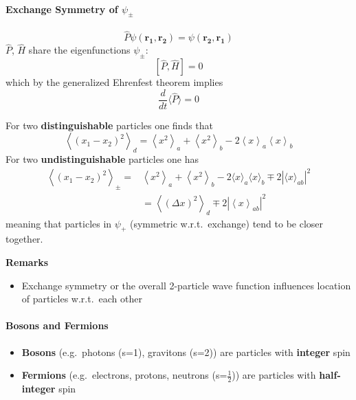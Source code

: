 \paragraph[Exchange Symmetry]{Exchange Symmetry of $\psi_\pm$}

\newpar{}

\begin{equation*}
    \widehat{P}\psi(\mathbf{r_1},\mathbf{r_2})=\psi(\mathbf{r_2},\mathbf{r_1})
\end{equation*}
$\widehat{P}$, $\widehat{H}$ share the eigenfunctions $\psi_{\pm}$:
\begin{equation*}
    \left[\widehat{P},\widehat{H}\right]=0
\end{equation*}
which by the generalized Ehrenfest theorem implies
\begin{equation*}
    \frac{d}{dt}\langle\widehat{P}\rangle=0
\end{equation*}

For two \textbf{distinguishable} particles one finds that
\begin{equation*}
    \left\langle{\left(x_{1}-x_{2}\right)}^{2}\right\rangle_{d}=\left\langle x^{2}\right\rangle_{a}+\left\langle x^{2}\right\rangle_{b}-2\left\langle x\right\rangle_{a}\left\langle x\right\rangle_{b}
\end{equation*}
For two \textbf{undistinguishable} particles one has
\begin{align*}
    \left\langle{\left(x_{1}-x_{2}\right)}^{2}\right\rangle_{\pm}= & \left\langle x^{2}\right\rangle_{a}+\left\langle x^{2}\right\rangle_{b}-2\langle x\rangle_{a}\langle x\rangle_{b}\mp2|\langle x\rangle_{ab}|^{2} \\
                                                                   & =\left\langle{\left(\Delta x\right)}^{2}\right\rangle_{d}\mp2\left|\left\langle x\right\rangle_{ab}\right|^{2}
\end{align*}
meaning that particles in $\psi_{+}$ (symmetric w.r.t.\ exchange) tend to be closer together.

\textbf{Remarks}
\begin{itemize}
    \item Exchange symmetry or the overall 2-particle wave function influences location of particles w.r.t.\ each other
\end{itemize}

\paragraph{Bosons and Fermions}
\begin{itemize}
    \item \textbf{Bosons} (e.g.\ photons (s=1), gravitons (s=2)) are particles with \textbf{integer} spin
    \item \textbf{Fermions} (e.g.\ electrons, protons, neutrons (s=$\frac{1}{2}$)) are particles with \textbf{half-integer} spin
\end{itemize}

